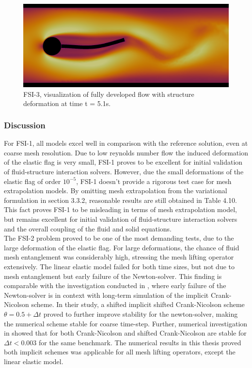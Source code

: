 \begin{figure}[h!]
  \centering
    \includegraphics[scale=0.2]{./Fig/fsi3flow.png}
      \caption{FSI-3, visualization of fully developed flow with structure deformation at time t = 5.1s.}
\end{figure}
\newpage
\subsubsection*{Discussion}
For FSI-1, all models excel well in comparison with the reference solution, even at coarse mesh resolution. Due to low reynolds number flow the induced deformation of the elastic flag is very small, FSI-1 proves to be excellent for initial validation of fluid-structure interaction solvers. However, due the small deformations of the elastic flag of order $10^{-5}$,  FSI-1 doesn't provide a rigorous test case for mesh extrapolation models.  By omitting mesh extrapolation from the variational formulation in section 3.3.2,  reasonable results are still obtained in Table 4.10. This fact proves FSI-1 to be misleading in terms of mesh extrapolation model, but remains excellent for initial validation of fluid-structure interaction solvers and the overall coupling of the fluid and solid equations. \\
The FSI-2 problem proved to be one of the most demanding tests, due to the large deformation of the elastic flag. For large deformations, the chance of fluid mesh entanglement was considerably high, stressing the mesh lifting operator extensively. The linear elastic model failed for both time sizes, but not due to mesh entanglement but early failure of the Newton-solver. This finding is comparable with the investigation conducted in \cite{Richter2015}, where early failure of the Newton-solver is in context with long-term simulation of the implicit Crank-Nicolson scheme. In their study, a shifted implicit shifted Crank-Nicolson scheme $\theta = 0.5 + \Delta t$ proved to further improve stability for the newton-solver, making the numerical scheme stable for coarse time-step. Further, numerical investigation in \cite{Richter2015} showed that for both Crank-Nicolson and  shifted Crank-Nicolson are stable for $\Delta t < 0.003$ for the same benchmark. The numerical results in this thesis proved both implicit schemes was applicable for all mesh lifting operators, except the linear elastic model. \\
